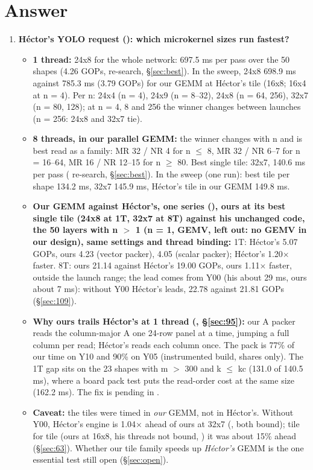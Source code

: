 \section*{Answer}
\begin{enumerate}\setlength\itemsep{4pt}
\item \textbf{H\'ector's YOLO request (): which microkernel sizes run fastest?}
  \begin{itemize}\setlength\itemsep{1pt}
  \item \textbf{1 thread:} 24x8 for the whole network: 697.5 ms per pass over the 50 shapes (4.26 GOPs,  re-search, \S\ref{sec:best}). In the  sweep, 24x8 698.9 ms against 785.3 ms (3.79 GOPs) for our GEMM at H\'ector's tile (16x8; 16x4 at n = 4). Per n: 24x4 (n = 4), 24x9 (n = 8--32), 24x8 (n = 64, 256), 32x7 (n = 80, 128); at n = 4, 8 and 256 the winner changes between launches (n = 256: 24x8 and 32x7 tie).
  \item \textbf{8 threads, in our parallel GEMM:} the winner changes with n and is best read as a family: MR 32 / NR 4 for n $\le$ 8, MR 32 / NR 6--7 for n = 16--64, MR 16 / NR 12--15 for n $\ge$ 80. Best single tile: 32x7, 140.6 ms per pass ( re-search, \S\ref{sec:best}). In the  sweep (one run): best tile per shape 134.2 ms, 32x7 145.9 ms, H\'ector's tile in our GEMM 149.8 ms.
  \item \textbf{Our GEMM against H\'ector's, one series (), ours at its best single tile (24x8 at 1T, 32x7 at 8T) against his unchanged code, the 50 layers with n $>$ 1 (n = 1, GEMV, left out: no GEMV in our design), same settings and thread binding:} 1T: H\'ector's 5.07 GOPs, ours 4.23 (vector packer), 4.05 (scalar packer); H\'ector's 1.20$\times$ faster. 8T: ours 21.14 against H\'ector's 19.00 GOPs, ours 1.11$\times$ faster, outside the launch range; the lead comes from Y00 (his about 29 ms, ours about 7 ms): without Y00 H\'ector's leads, 22.78 against 21.81 GOPs (\S\ref{sec:109}).
  \item \textbf{Why ours trails H\'ector's at 1 thread (, \S\ref{sec:95}):} our A packer reads the column-major A one 24-row panel at a time, jumping a full column per read; H\'ector's reads each column once. The pack is 77\% of our time on Y10 and 90\% on Y05 (instrumented build, shares only). The 1T gap sits on the 23 shapes with m $>$ 300 and k $\le$ kc (131.0 of 140.5 ms), where a board pack test puts the read-order cost at the same size (162.2 ms). The fix is pending in .
  \item \textbf{Caveat:} the tiles were timed in \emph{our} GEMM, not in H\'ector's. Without Y00, H\'ector's engine is 1.04$\times$ ahead of ours at 32x7 (, both bound); tile for tile (ours at 16x8, his threads not bound, ) it was about 15\% ahead (\S\ref{sec:63}). Whether our tile family speeds up \emph{H\'ector's} GEMM is the one essential test still open (\S\ref{sec:open}).

\end{itemize}
\end{enumerate}
